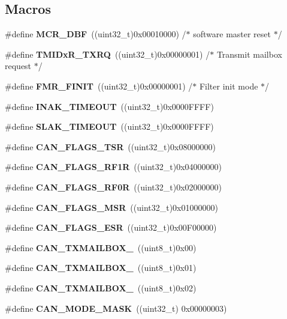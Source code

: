 \subsection*{Macros}
\begin{DoxyCompactItemize}
\item 
\#define \textbf{ M\+C\+R\+\_\+\+D\+BF}~((uint32\+\_\+t)0x00010000) /$\ast$ software master reset $\ast$/
\item 
\#define \textbf{ T\+M\+I\+Dx\+R\+\_\+\+T\+X\+RQ}~((uint32\+\_\+t)0x00000001) /$\ast$ Transmit mailbox request $\ast$/
\item 
\#define \textbf{ F\+M\+R\+\_\+\+F\+I\+N\+IT}~((uint32\+\_\+t)0x00000001) /$\ast$ Filter init mode $\ast$/
\item 
\#define \textbf{ I\+N\+A\+K\+\_\+\+T\+I\+M\+E\+O\+UT}~((uint32\+\_\+t)0x0000\+F\+F\+F\+F)
\item 
\#define \textbf{ S\+L\+A\+K\+\_\+\+T\+I\+M\+E\+O\+UT}~((uint32\+\_\+t)0x0000\+F\+F\+F\+F)
\item 
\#define \textbf{ C\+A\+N\+\_\+\+F\+L\+A\+G\+S\+\_\+\+T\+SR}~((uint32\+\_\+t)0x08000000)
\item 
\#define \textbf{ C\+A\+N\+\_\+\+F\+L\+A\+G\+S\+\_\+\+R\+F1R}~((uint32\+\_\+t)0x04000000)
\item 
\#define \textbf{ C\+A\+N\+\_\+\+F\+L\+A\+G\+S\+\_\+\+R\+F0R}~((uint32\+\_\+t)0x02000000)
\item 
\#define \textbf{ C\+A\+N\+\_\+\+F\+L\+A\+G\+S\+\_\+\+M\+SR}~((uint32\+\_\+t)0x01000000)
\item 
\#define \textbf{ C\+A\+N\+\_\+\+F\+L\+A\+G\+S\+\_\+\+E\+SR}~((uint32\+\_\+t)0x00\+F00000)
\item 
\#define \textbf{ C\+A\+N\+\_\+\+T\+X\+M\+A\+I\+L\+B\+O\+X\+\_}~((uint8\+\_\+t)0x00)
\item 
\#define \textbf{ C\+A\+N\+\_\+\+T\+X\+M\+A\+I\+L\+B\+O\+X\+\_}~((uint8\+\_\+t)0x01)
\item 
\#define \textbf{ C\+A\+N\+\_\+\+T\+X\+M\+A\+I\+L\+B\+O\+X\+\_}~((uint8\+\_\+t)0x02)
\item 
\#define \textbf{ C\+A\+N\+\_\+\+M\+O\+D\+E\+\_\+\+M\+A\+SK}~((uint32\+\_\+t) 0x00000003)
\end{DoxyCompactItemize}
